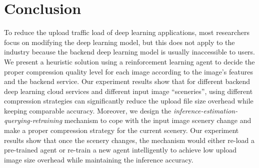 \section{Conclusion}
\label{Section: conclusion}

To reduce the upload traffic load of deep learning applications, most researchers focus on modifying the deep learning model, but this does not apply to the industry because the backend deep learning model is usually inaccessible to users. We present a heuristic solution using a reinforcement learning agent to decide the proper compression quality level for each image according to the image's features and the backend service. Our experiment results show that for different backend deep learning cloud services and different input image ``sceneries'', using different compression strategies can significantly reduce the upload file size overhead while keeping comparable accuracy. Moreover, we design the \emph{inference-estimation-querying-retraining} mechanism to cope with the input image scenery change and make a proper compression strategy for the current scenery. Our experiment results show that once the scenery changes, the mechanism would either re-load a pre-trained agent or re-train a new agent intelligently to achieve low upload image size overhead while maintaining the inference accuracy.
